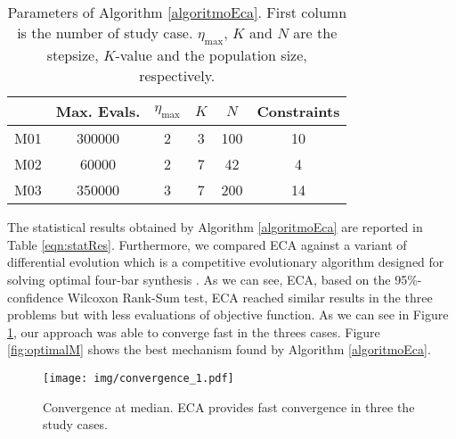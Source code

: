 \documentclass[12pt,letterpape]{article}
\begin{document}
\begin{table}[!ht]
	\centering
	\begin{tabular}{cccccc}
		    & Max. Evals. & $\eta_{\max}$ & $K$ & $N$ & Constraints \\ \hline
		M01 &   300000    &     2         &  3  & 100 & 10\\
		M02 &    60000    &     2         &  7  & 42  & 4 \\
		M03 &   350000    &     3         &  7  & 200 & 14\\
	\end{tabular}
	\caption{Parameters of Algorithm \ref{algoritmoEca}. First column is the number
	of study case. $\eta_{\max}$, $K$ and $N$ are the stepsize, $K$-value and the population size, respectively.}
	\label{tab:parms}
\end{table}

The statistical results obtained by Algorithm \ref{algoritmoEca} are reported in
Table \ref{eqn:statRes}. Furthermore, we compared ECA against a variant of differential
evolution \cite{ed1995} which is a competitive evolutionary algorithm designed for solving
optimal four-bar synthesis \cite{hernandez2016}. As we can see, ECA, based on the 95\%-confidence
Wilcoxon Rank-Sum test, ECA reached similar results in the three problems but with
less evaluations of objective function. As we can see in Figure \ref{fig:convMedian1},
our approach was able to converge fast in the threes cases.
Figure \ref{fig:optimalM} shows the best mechanism found by Algorithm \ref{algoritmoEca}.

\begin{figure}[!ht]
	\centering
	\texttt{[image: img/convergence\_1.pdf]}
	\caption{Convergence at median. ECA provides fast convergence in three the study cases.}
	\label{fig:convMedian1}
\end{figure}



		
\end{document}
